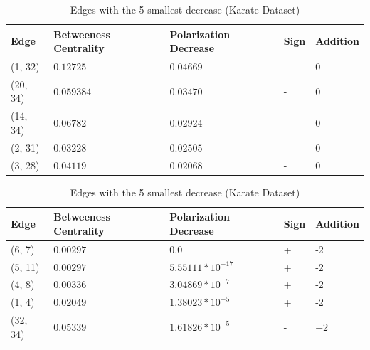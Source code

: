 \begin{table}[htbp]
 \centering
 \caption{Edges with the 5 largest decrease (Karate Dataset)}
 \label{tab:edgesLargest}
 \begin{tabular}{| l || l | l | l | l |}
 \hline
  Edge & Betweeness Centrality & Polarization Decrease & Sign & Addition\\
  \hline
  \hline
  (1, 32) & $0.12725$ & $0.04669$ & - &  0\\
  \hline
  (20, 34) & $0.059384$ & $0.03470$ & - &  0\\
  \hline
  (14, 34) & $0.06782$ & $0.02924$ & - &  0\\
  \hline
  (2, 31) & $0.03228$ & $0.02505$ & - &  0\\
  \hline
  (3, 28) & $0.04119$ & $0.02068$ & - &  0\\
  \hline
 \end{tabular}
  
 \caption{Edges with the 5 smallest decrease (Karate Dataset)}
 \label{tab:edgesLargest}
 \begin{tabular}{| l || l | l | l | l |}
 \hline
  Edge & Betweeness Centrality & Polarization Decrease & Sign & Addition\\
  \hline
  \hline
  (6, 7) & $0.00297$ & $0.0$ & + &  -2\\
  \hline
  (5, 11) & $0.00297$ & $5.55111*10^{-17}$ & + &  -2\\
  \hline
  (4, 8) & $0.00336$ & $3.04869*10^{-7}$ & + &  -2\\
  \hline
  (1, 4) & $0.02049$ & $1.38023*10^{-5}$ & + &  -2\\
  \hline
  (32, 34) & $0.05339$ & $1.61826*10^{-5}$ & - &  +2\\
  \hline
  \hline
 \end{tabular}
 
\end{table}

